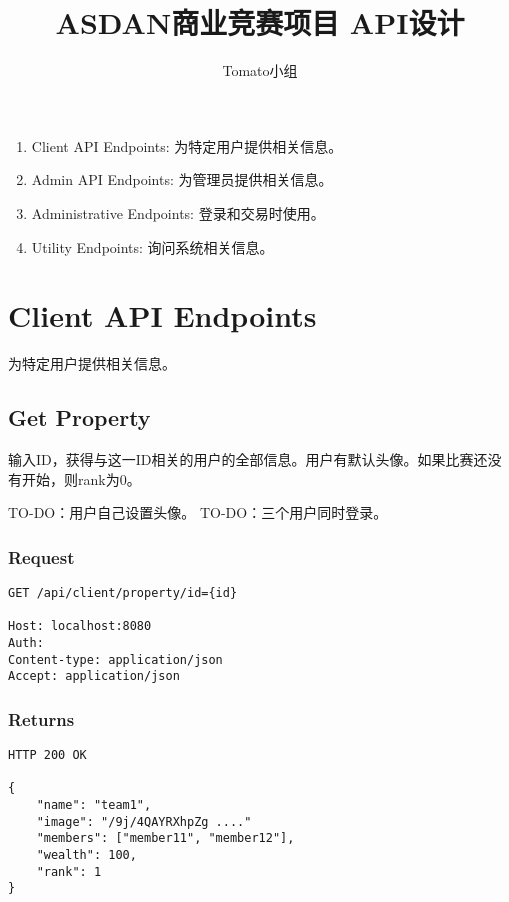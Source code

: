 \documentclass{article}
\title{ASDAN商业竞赛项目 API设计}
\author{Tomato小组}
\begin{document}
\maketitle

\tableofcontents

\newpage

\begin{enumerate}
	\item Client API Endpoints: 为特定用户提供相关信息。
	\item Admin API Endpoints: 为管理员提供相关信息。
	\item Administrative Endpoints: 登录和交易时使用。
	\item Utility Endpoints: 询问系统相关信息。
\end{enumerate}

\section{Client API Endpoints}

为特定用户提供相关信息。

\subsection{Get Property}

输入ID，获得与这一ID相关的用户的全部信息。用户有默认头像。如果比赛还没有开始，则rank为0。

TO-DO：用户自己设置头像。
TO-DO：三个用户同时登录。

\subsubsection*{Request}
\begin{lstlisting}
GET /api/client/property/id={id}

Host: localhost:8080
Auth:
Content-type: application/json
Accept: application/json
\end{lstlisting}

\subsubsection*{Returns}
\begin{lstlisting}
HTTP 200 OK

{
    "name": "team1",
    "image": "/9j/4QAYRXhpZg ...."
    "members": ["member11", "member12"],
    "wealth": 100,
    "rank": 1
}
\end{lstlisting}
\end{document}
